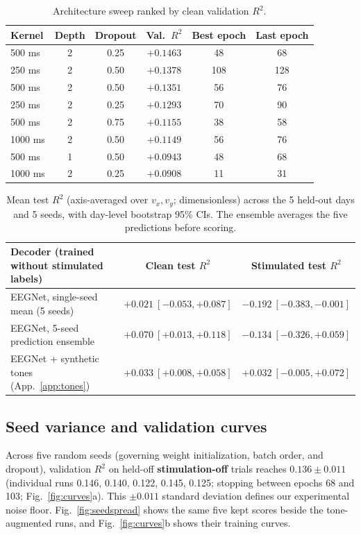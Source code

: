\documentclass[11pt]{article}
\begin{document}
\begin{table}[htbp]\centering
\caption{Architecture sweep ranked by clean validation $R^2$.}
\begin{tabular}{@{}lccccc@{}}\toprule
Kernel & Depth & Dropout & Val.\ $R^2$ & Best epoch & Last epoch \\ \midrule
500 ms  & 2 & 0.25 & $+0.1463$ & 48  & 68  \\ 
250 ms  & 2 & 0.50 & $+0.1378$ & 108 & 128 \\
500 ms  & 2 & 0.50 & $+0.1351$ & 56  & 76  \\ 
250 ms  & 2 & 0.25 & $+0.1293$ & 70  & 90  \\
500 ms  & 2 & 0.75 & $+0.1155$ & 38  & 58  \\ 
1000 ms & 2 & 0.50 & $+0.1149$ & 56  & 76  \\
500 ms  & 1 & 0.50 & $+0.0943$ & 48  & 68  \\ 
1000 ms & 2 & 0.25 & $+0.0908$ & 11  & 31  \\
\bottomrule\end{tabular}\label{tab:sweep}
\end{table}


\begin{table}[htbp]\centering
\caption{Mean test $R^2$ (axis-averaged over $v_x,v_y$; dimensionless) across the 5 held-out days and 5 seeds, with day-level bootstrap 95\% CIs. The ensemble averages the five predictions before scoring.}
\small
\begin{tabular}{@{}lcc@{}}\toprule
Decoder (trained without stimulated labels) & Clean test $R^2$ & Stimulated test $R^2$ \\ \midrule
EEGNet, single-seed mean (5 seeds) & $+0.021\ [-0.053,+0.087]$ & $-0.192\ [-0.383,-0.001]$ \\
EEGNet, 5-seed prediction ensemble & $+0.070\ [+0.013,+0.118]$ & $-0.134\ [-0.326,+0.059]$ \\
EEGNet + synthetic tones (App.~\ref{app:tones}) & $+0.033\ [+0.008,+0.058]$ & $+0.032\ [-0.005,+0.072]$ \\
\bottomrule\end{tabular}\label{tab:baseline}
\end{table}

\subsection{Seed variance and validation curves}\label{sec:seeds}
Across five random seeds (governing weight initialization, batch order, and dropout), validation $R^2$ on held-off \textbf{stimulation-off} trials reaches $0.136\pm0.011$ (individual runs 0.146, 0.140, 0.122, 0.145, 0.125; stopping between epochs 68 and 103; Fig.~\ref{fig:curves}a). This $\pm 0.011$ standard deviation defines our experimental noise floor. Fig.~\ref{fig:seedspread} shows the same five kept scores beside the tone-augmented runs, and Fig.~\ref{fig:curves}b shows their training curves.
\end{document}
